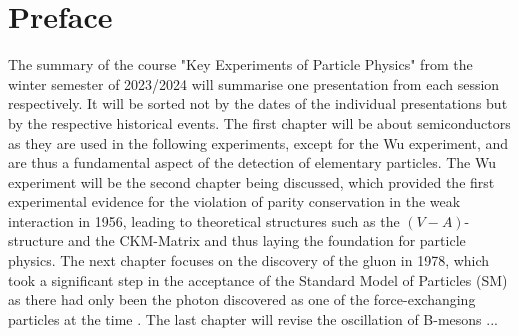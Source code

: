 \thispagestyle{plain}

\section*{Preface}

The summary of the course "Key Experiments of Particle Physics" from the winter semester of 2023/2024 will summarise one presentation from each session respectively.
It will be sorted not by the dates of the individual presentations but by the respective historical events.
The first chapter will be about semiconductors as they are used in the following experiments, except for the Wu experiment, and are thus a fundamental aspect of the detection of elementary particles.
The Wu experiment will be the second chapter being discussed, which provided the first experimental evidence for the violation of parity conservation in the weak interaction in 1956, leading to theoretical structures such as the $(V-A)$-structure and the CKM-Matrix and thus laying the foundation for particle physics.
The next chapter focuses on the discovery of the gluon in 1978, which took a significant step in the acceptance of the Standard Model of Particles (SM) \cite{Gaillard1998ui} as there had only been the photon discovered as one of the force-exchanging particles at the time \cite{DesyGluon}.
The last chapter will revise the oscillation of B-mesons ...